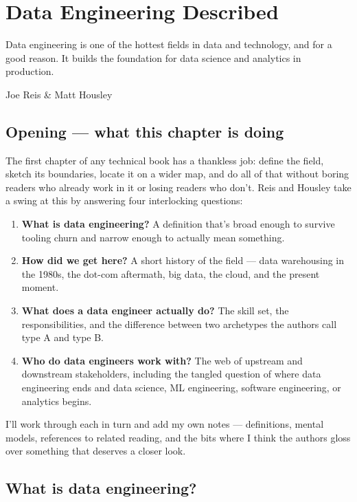 \chapter{Data Engineering Described}

\epigraph{Data engineering is one of the hottest fields in data and technology, and for a good reason. It builds the foundation for data science and analytics in production.}{Joe Reis \& Matt Housley}

\section*{Opening — what this chapter is doing}

The first chapter of any technical book has a thankless job: define the field, sketch its boundaries, locate it on a wider map, and do all of that without boring readers who already work in it or losing readers who don't. Reis and Housley take a swing at this by answering four interlocking questions:

\begin{enumerate}[leftmargin=*]
  \item \textbf{What is data engineering?} A definition that's broad enough to survive tooling churn and narrow enough to actually mean something.
  \item \textbf{How did we get here?} A short history of the field — data warehousing in the 1980s, the dot-com aftermath, big data, the cloud, and the present moment.
  \item \textbf{What does a data engineer actually do?} The skill set, the responsibilities, and the difference between two archetypes the authors call type A and type B.
  \item \textbf{Who do data engineers work with?} The web of upstream and downstream stakeholders, including the tangled question of where data engineering ends and data science, ML engineering, software engineering, or analytics begins.
\end{enumerate}

I'll work through each in turn and add my own notes — definitions, mental models, references to related reading, and the bits where I think the authors gloss over something that deserves a closer look.

\section{What is data engineering?}

